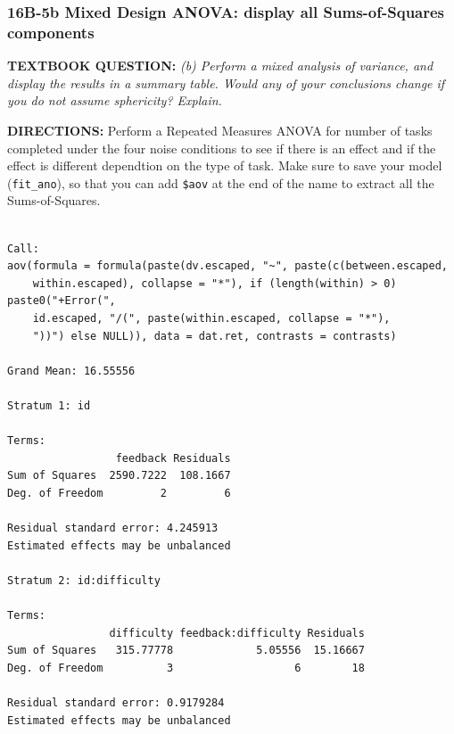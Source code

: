 \documentclass[]{article}
\newenvironment{Shaded}{\begin{snugshade}}{\end{snugshade}}
\newcommand{\KeywordTok}[1]{\textcolor[rgb]{0.13,0.29,0.53}{\textbf{#1}}}
\newcommand{\DataTypeTok}[1]{\textcolor[rgb]{0.13,0.29,0.53}{#1}}
\newcommand{\StringTok}[1]{\textcolor[rgb]{0.31,0.60,0.02}{#1}}
\newcommand{\CommentTok}[1]{\textcolor[rgb]{0.56,0.35,0.01}{\textit{#1}}}
\newcommand{\OperatorTok}[1]{\textcolor[rgb]{0.81,0.36,0.00}{\textbf{#1}}}
\newcommand{\NormalTok}[1]{#1}
\begin{document}
\clearpage

\subsubsection{16B-5b Mixed Design ANOVA: display all Sums-of-Squares
components}\label{b-5b-mixed-design-anova-display-all-sums-of-squares-components}

\textbf{TEXTBOOK QUESTION:} \emph{(b) Perform a mixed analysis of
variance, and display the results in a summary table. Would any of your
conclusions change if you do not assume sphericity? Explain.}

\textbf{DIRECTIONS:} Perform a Repeated Measures ANOVA for number of
tasks completed under the four noise conditions to see if there is an
effect and if the effect is different dependtion on the type of task.
Make sure to save your model (\texttt{fit\_ano}), so that you can add
\texttt{\$aov} at the end of the name to extract all the
Sums-of-Squares.

\begin{Shaded}
\end{Shaded}

\begin{verbatim}

Call:
aov(formula = formula(paste(dv.escaped, "~", paste(c(between.escaped, 
    within.escaped), collapse = "*"), if (length(within) > 0) paste0("+Error(", 
    id.escaped, "/(", paste(within.escaped, collapse = "*"), 
    "))") else NULL)), data = dat.ret, contrasts = contrasts)

Grand Mean: 16.55556

Stratum 1: id

Terms:
                 feedback Residuals
Sum of Squares  2590.7222  108.1667
Deg. of Freedom         2         6

Residual standard error: 4.245913
Estimated effects may be unbalanced

Stratum 2: id:difficulty

Terms:
                difficulty feedback:difficulty Residuals
Sum of Squares   315.77778             5.05556  15.16667
Deg. of Freedom          3                   6        18

Residual standard error: 0.9179284
Estimated effects may be unbalanced
\end{verbatim}
\end{document}

